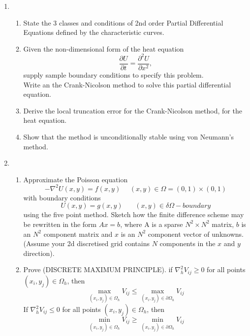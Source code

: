 \begin{enumerate}
\begin{enumerate}
					
	\end{enumerate}
	\item
		\begin{enumerate}
		\item
		State the 3 classes and conditions of 2nd order Partial Differential Equations defined by the characteristic curves.
		\item
		Given the non-dimensional form of the heat equation
		\[\frac{\partial U}{\partial t} = \frac{\partial^2 U}{\partial x^2},\]
		supply sample boundary conditions to specify this problem.\\
		Write an the Crank-Nicolson method to solve this partial differential equation.
		\item
		Derive the local truncation error for the Crank-Nicolson method, for the heat equation.\\
						
		\item
		Show that the method is unconditionally stable using von Neumann's method.
		
			
	\end{enumerate}
	\item
	\begin{enumerate}
		\item
		Approximate the Poisson equation 
		\[ -\nabla^2U(x,y)=f(x,y) \ \ \ \ \ \ (x,y) \in \Omega=(0,1)\times (0,1) \]
		with boundary conditions
		\[U(x,y) = g(x,y) \ \ \ \ \ \ \ \  (x,y)\in\delta\Omega-boundary \]
		using the five point method.  Sketch how the finite difference scheme may be 
		rewritten in the form $Ax=b$, where A is a sparse
		$N^2\times N^2$ matrix, $b$ is an $N^2$ component matrix and $x$ is an $N^2$
		component vector of unknowns.
		(Assume your 2d discretised grid contains $N$ components in the $x$ and $y$ direction).
		
		\item Prove (DISCRETE MAXIMUM PRINCIPLE).
		if $\nabla^2_hV_{ij}\geq 0$ for all points $(x_i,y_j) \in \Omega_h$, then
		\[ \max_{(x_i,y_j)\in\Omega_h}V_{ij}\leq  \max_{(x_i,y_j)\in\partial\Omega_h}V_{ij}\]
		If $\nabla^2_hV_{ij}\leq 0$ for all points $(x_i,y_j) \in \Omega_h$, then
		\[ \min_{(x_i,y_j)\in\Omega_h}V_{ij}\geq  \min_{(x_i,y_j)\in\partial\Omega_h}V_{ij}\]


\end{enumerate}
\end{enumerate}
